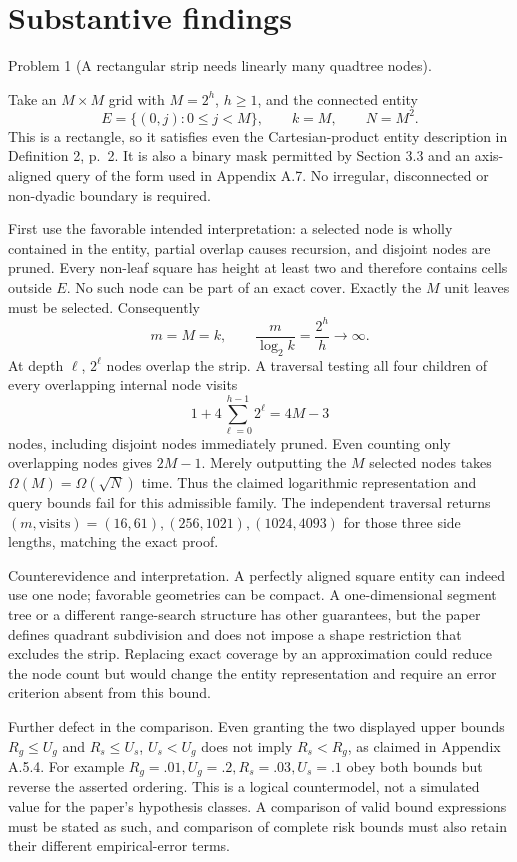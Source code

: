\documentclass[10pt]{article}
\begin{document}
\section*{Substantive findings}
Problem 1 (A rectangular strip needs linearly many quadtree nodes).\par
Take an \(M\times M\) grid with \(M=2^h\), \(h\geq1\), and the connected entity \[E=\{(0,j):0\leq j<M\},\qquad k=M,\qquad N=M^2.\] This is a rectangle, so it satisfies even the Cartesian-product entity description in Definition 2, p. 2. It is also a binary mask permitted by Section 3.3 and an axis-aligned query of the form used in Appendix A.7. No irregular, disconnected or non-dyadic boundary is required.\par
First use the favorable intended interpretation: a selected node is wholly contained in the entity, partial overlap causes recursion, and disjoint nodes are pruned. Every non-leaf square has height at least two and therefore contains cells outside \(E\). No such node can be part of an exact cover. Exactly the \(M\) unit leaves must be selected. Consequently \[m=M=k,\qquad \frac{m}{\log_2 k}=\frac{2^h}{h}\longrightarrow\infty.\] At depth \(\ell\), \(2^\ell\) nodes overlap the strip. A traversal testing all four children of every overlapping internal node visits \[1+4\sum_{\ell=0}^{h-1}2^\ell=4M-3\] nodes, including disjoint nodes immediately pruned. Even counting only overlapping nodes gives \(2M-1\). Merely outputting the \(M\) selected nodes takes \(\Omega(M)=\Omega(\sqrt N)\) time. Thus the claimed logarithmic representation and query bounds fail for this admissible family. The independent traversal returns \((m,\text{visits})=(16,61),(256,1021),
(1024,4093)\) for those three side lengths, matching the exact proof.\par
Counterevidence and interpretation. A perfectly aligned square entity can indeed use one node; favorable geometries can be compact. A one-dimensional segment tree or a different range-search structure has other guarantees, but the paper defines quadrant subdivision and does not impose a shape restriction that excludes the strip. Replacing exact coverage by an approximation could reduce the node count but would change the entity representation and require an error criterion absent from this bound.\par
Further defect in the comparison. Even granting the two displayed upper bounds \(R_g\leq U_g\) and \(R_s\leq U_s\), \(U_s<U_g\) does not imply \(R_s<R_g\), as claimed in Appendix A.5.4. For example \(R_g=.01,U_g=.2,R_s=.03,U_s=.1\) obey both bounds but reverse the asserted ordering. This is a logical countermodel, not a simulated value for the paper’s hypothesis classes. A comparison of valid bound expressions must be stated as such, and comparison of complete risk bounds must also retain their different empirical-error terms.\par
\end{document}
